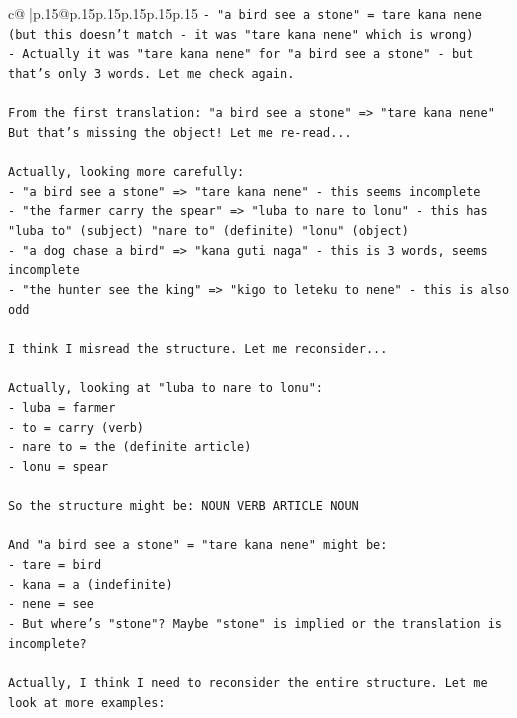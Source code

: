 \documentclass{article}
\begin{document}
{\begin{supertabular}{c@{$\;$}|p{.15\linewidth}@{}p{.15\linewidth}p{.15\linewidth}p{.15\linewidth}p{.15\linewidth}p{.15\linewidth}}
{{{\texttt{{-} "a bird see a stone" = tare kana nene (but this doesn't match {-} it was "tare kana nene" which is wrong)} \\
\texttt{{-} Actually it was "tare kana nene" for "a bird see a stone" {-} but that's only 3 words. Let me check again.} \\
\\ 
\texttt{From the first translation: "a bird see a stone" => "tare kana nene"} \\
\texttt{But that's missing the object! Let me re{-}read...} \\
\\ 
\texttt{Actually, looking more carefully:} \\
\texttt{{-} "a bird see a stone" => "tare kana nene" {-} this seems incomplete} \\
\texttt{{-} "the farmer carry the spear" => "luba to nare to lonu" {-} this has "luba to" (subject) "nare to" (definite) "lonu" (object)} \\
\texttt{{-} "a dog chase a bird" => "kana guti naga" {-} this is 3 words, seems incomplete} \\
\texttt{{-} "the hunter see the king" => "kigo to leteku to nene" {-} this is also odd} \\
\\ 
\texttt{I think I misread the structure. Let me reconsider...} \\
\\ 
\texttt{Actually, looking at "luba to nare to lonu":} \\
\texttt{{-} luba = farmer} \\
\texttt{{-} to = carry (verb)} \\
\texttt{{-} nare to = the (definite article)} \\
\texttt{{-} lonu = spear} \\
\\ 
\texttt{So the structure might be: NOUN VERB ARTICLE NOUN} \\
\\ 
\texttt{And "a bird see a stone" = "tare kana nene" might be:} \\
\texttt{{-} tare = bird} \\
\texttt{{-} kana = a (indefinite)} \\
\texttt{{-} nene = see} \\
\texttt{{-} But where's "stone"? Maybe "stone" is implied or the translation is incomplete?} \\
\\ 
\texttt{Actually, I think I need to reconsider the entire structure. Let me look at more examples:} \\
}}}
\end{supertabular}}
\end{document}
